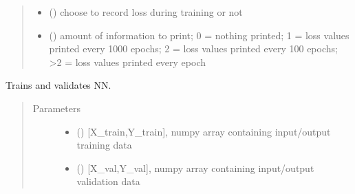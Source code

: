 \documentclass[letterpaper,10pt,english]{sphinxmanual}
\begin{document}
\begin{fulllineitems}
\begin{fulllineitems}
\begin{quote}
\begin{description}
\begin{itemize}
\item {} 
\sphinxAtStartPar
{} () \textendash{} choose to record loss during training or not

\item {} 
\sphinxAtStartPar
{} () \textendash{} amount of information to print; 0 = nothing printed; 1 = loss values printed every 1000 epochs; 2 = loss values printed every 100 epochs; \textgreater{}2 = loss values printed every epoch

\end{itemize}

\end{description}\end{quote}

\end{fulllineitems}


\begin{fulllineitems}
\label{\detokenize{rom:rom.response_surfaces.NN_alt.train_NN}}
\sphinxAtStartPar
Trains and validates NN.
\begin{quote}\begin{description}
\item[{Parameters}] \leavevmode\begin{itemize}
\item {} 
\sphinxAtStartPar
{} (\sphinxstyleliteralemphasis{\sphinxupquote{,}}) \textendash{} {[}X\_train,Y\_train{]}, numpy array containing input/output training data

\item {} 
\sphinxAtStartPar
{} (\sphinxstyleliteralemphasis{\sphinxupquote{,}}) \textendash{} {[}X\_val,Y\_val{]}, numpy array containing input/output validation data


\end{itemize}
\end{description}
\end{quote}
\end{fulllineitems}
\end{fulllineitems}
\end{document}

